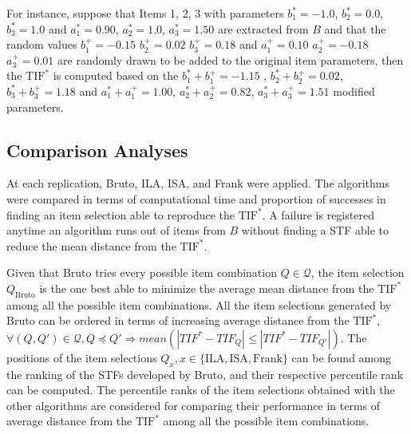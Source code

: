 \documentclass[12pt, a4paper, titilepage]{article}
\begin{document}
For instance, suppose that Items 1, 2, 3 with parameters $b_1^* =-1.0$, $b_2^* =0.0$, $b_3^* = 1.0$ and $a_1^* =0.90$, $a_2^* =1.0$, $a_3^* = 1.50$ are extracted from $B$ and that the random values $b_1^+ =-0.15$ $b_2^+ =0.02$ $b_3^+ = 0.18$ and $a_1^+ = 0.10$ $a_2^+ = -0.18$ $a_3^+ = 0.01$ are randomly drawn to be added to the original item parameters, then the $\text{TIF}^*$ is computed based on the $b_1^* + b_1^+ = -1.15$ , $b_2^* + b_2^+ = 0.02$, $b_3^* + b_3^+ = 1.18$ and $a_1^* + a_1^+ = 1.00$, $a_2^* + a_2^+ = 0.82$, $a_3^* + a_3^+ = 1.51$ modified parameters.


\subsection*{Comparison Analyses}
At each replication, Bruto, ILA, ISA, and Frank were applied.
The algorithms were compared in terms of computational time and proportion of successes in finding an item selection able to reproduce the $\text{TIF}^*$.
A failure is registered anytime an algorithm runs out of items from $B$ without finding a STF able to reduce the mean distance from the $\text{TIF}^*$.

Given that Bruto tries every possible item combination $Q \in \mathcal{Q}$, the item selection $Q_{\text{Bruto}}$ is the one best able to minimize the average mean distance from the $\text{TIF}^*$ among all the possible item combinations.
All the item selections generated by Bruto can be ordered in terms of increasing average distance from the $\text{TIF}^*$, $\forall (Q, Q') \in \mathcal{Q}, Q \preceq Q' \Rightarrow mean(|TIF^* - TIF_Q| \leq |TIF^* - TIF_{Q'}|)$.
The positions of the item selections $Q_x, x \in \{\text{ILA}, \text{ISA}, \text{Frank}\}$ can be found among the ranking of the STFs developed by Bruto, and their respective percentile rank can be computed.  
The percentile ranks of the item selections obtained with the other algorithms are considered for comparing their performance in terms of average distance from the $\text{TIF}^*$ among all the possible item combinations. 
\end{document}
